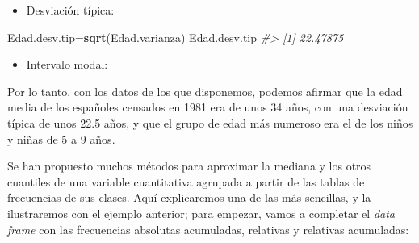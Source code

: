 \documentclass[
]{book}
\newenvironment{Shaded}{\begin{snugshade}}{\end{snugshade}}
\newcommand{\CommentTok}[1]{\textcolor[rgb]{0.56,0.35,0.01}{\textit{#1}}}
\newcommand{\DecValTok}[1]{\textcolor[rgb]{0.00,0.00,0.81}{#1}}
\newcommand{\KeywordTok}[1]{\textcolor[rgb]{0.13,0.29,0.53}{\textbf{#1}}}
\newcommand{\NormalTok}[1]{#1}
\newcommand{\OperatorTok}[1]{\textcolor[rgb]{0.81,0.36,0.00}{\textbf{#1}}}
\providecommand{\tightlist}{%
  \setlength{\itemsep}{0pt}\setlength{\parskip}{0pt}}
\theoremstyle{definition}
\theoremstyle{definition}
\theoremstyle{definition}
\theoremstyle{remark}
\begin{document}
\begin{Shaded}
\end{Shaded}

\begin{itemize}
\tightlist
\item
  Desviación típica:
\end{itemize}

\begin{Shaded}
\begin{Highlighting}[]
\NormalTok{Edad.desv.tip=}\KeywordTok{sqrt}\NormalTok{(Edad.varianza)  }
\NormalTok{Edad.desv.tip}
\CommentTok{\#\textgreater{} [1] 22.47875}
\end{Highlighting}
\end{Shaded}

\begin{itemize}
\tightlist
\item
  Intervalo modal:
\end{itemize}

\begin{Shaded}
\end{Shaded}

Por lo tanto, con los datos de los que disponemos, podemos afirmar que la edad media de los españoles censados en 1981 era de unos 34 años, con una desviación típica de unos 22.5 años, y que el grupo de edad más numeroso era el de los niños y niñas de 5 a 9 años.

Se han propuesto muchos métodos para aproximar la mediana y los otros cuantiles de una variable cuantitativa agrupada a partir de las tablas de frecuencias de sus clases. Aquí explicaremos una de las más sencillas, y la ilustraremos con el ejemplo anterior; para empezar, vamos a completar el \emph{data frame} con las frecuencias absolutas acumuladas, relativas y relativas acumuladas:
\end{document}
